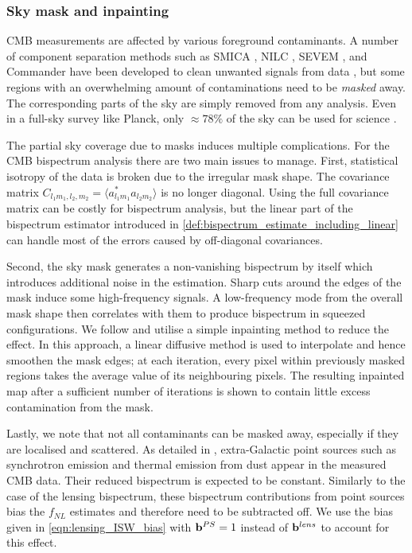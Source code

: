 \subsubsection*{Sky mask and inpainting}

CMB measurements are affected by various foreground contaminants. A number of component separation methods such as SMICA \cite{Cardoso2008component}, NILC \cite{Basak2012nilc}, SEVEM \cite{Martinez2003sevem}, and Commander \cite{Eriksen2008commander} have been developed to clean unwanted signals from data \cite{PlanckCollaboration2018component}, but some regions with an overwhelming amount of contaminations need to be \textit{masked} away. The corresponding parts of the sky are simply removed from any analysis. Even in a full-sky survey like Planck, only $\approx 78\%$ of the sky can be used for science \cite{PlanckCollaboration2018component}.

The partial sky coverage due to masks induces multiple complications. For the CMB bispectrum analysis there are two main issues to manage. First, statistical isotropy of the data is broken due to the irregular mask shape. The covariance matrix $C_{l_1 m_1, l_2, m_2} = \langle a^*_{l_1 m_1} a_{l_2 m_2} \rangle$ is no longer diagonal. Using the full covariance matrix can be costly for bispectrum analysis, but the linear part of the bispectrum estimator introduced in \eqref{def:bispectrum_estimate_including_linear} can handle most of the errors caused by off-diagonal covariances.

Second, the sky mask generates a non-vanishing bispectrum by itself which introduces additional noise in the estimation. Sharp cuts around the edges of the mask induce some high-frequency signals. A low-frequency mode from the overall mask shape then correlates with them to produce bispectrum in squeezed configurations. We follow \cite{Gruetjen2017inpainting} and utilise a simple inpainting method to reduce the effect. In this approach, a linear diffusive method is used to interpolate and hence smoothen the mask edges; at each iteration, every pixel within previously masked regions takes the average value of its neighbouring pixels. The resulting inpainted map after a sufficient number of iterations is shown to contain little excess contamination from the mask. 

Lastly, we note that not all contaminants can be masked away, especially if they are localised and scattered. As detailed in \cite{PlanckCollaboration2013}, extra-Galactic point sources such as synchrotron emission and thermal emission from dust appear in the measured CMB data. Their reduced bispectrum is expected to be constant. Similarly to the case of the lensing bispectrum, these bispectrum contributions from point sources bias the $f_{NL}$ estimates and therefore need to be subtracted off. We use the bias given in \eqref{eqn:lensing_ISW_bias} with $\mathbf{b}^{PS}=1$ instead of $\mathbf{b}^{lens}$ to account for this effect.

